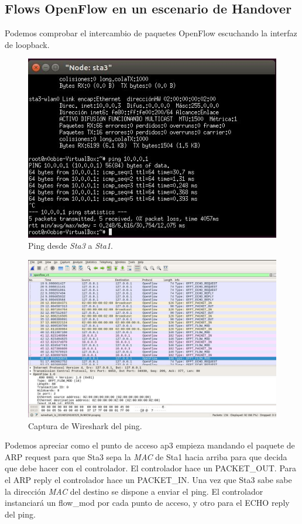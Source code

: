\subsection{Flows OpenFlow en un escenario de Handover}
Podemos comprobar el intercambio de paquetes OpenFlow escuchando la interfaz de loopback.
\newpage
\begin{figure}[!htb]
  \centering
    \includegraphics[width=0.8\linewidth]{./img/15.JPG}
    \caption{Ping desde \textit{Sta3} a \textit{Sta1}.}
  \label{fig:yo}
\end{figure}
\begin{figure}[!htb]
  \centering
    \includegraphics[width=\linewidth]{./img/16.JPG}
    \caption{Captura de Wireshark del ping.}
  \label{fig:yo}
\end{figure}
\newpage
Podemos apreciar como el punto de acceso ap3 empieza mandando el paquete de ARP request para que Sta3 sepa la \textit{MAC} de Sta1 hacia arriba para que decida que debe hacer con el controlador. El controlador hace un PACKET\_OUT. Para el ARP reply el controlador hace un PACKET\_IN. Una vez que Sta3 sabe sabe la dirección \textit{MAC} del destino se dispone a enviar el ping. El controlador instanciará un flow\_mod por cada punto de acceso, y otro para el ECHO reply del ping.

